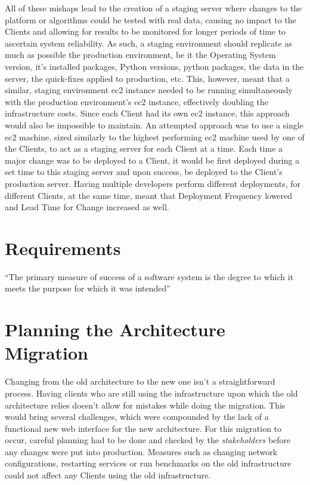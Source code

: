 All of these mishaps lead to the creation of a staging server where changes to the platform or algorithms could be tested with real data, causing no impact to the Clients and allowing for results to be monitored for longer periods of time to ascertain system reliability. As such, a staging environment should replicate as much as possible the production environment, be it the Operating System version, it's installed packages, Python versions, python packages, the data in the server, the quick-fixes applied to production, etc.
This, however, meant that a similar, staging environment \gls{ec2} instance needed to be running simultaneously with the production environment's \gls{ec2} instance, effectively doubling the infrastructure costs. Since each Client had its own \gls{ec2} instance, this approach would also be impossible to maintain. An attempted approach was to use a single \gls{ec2} machine, sized similarly to the highest performing \gls{ec2} machine used by one of the Clients, to act as a staging server for each Client at a time. Each time a major change was to be deployed to a Client, it would be first deployed during a set time to this staging server and upon success, be deployed to the Client's production server. Having multiple developers perform different deployments, for different Clients, at the same time, meant that Deployment Frequency lowered and Lead Time for Change increased as well.




\section{Requirements}\label{methodology:s:requirements}

``The primary measure of success of a software system is the
degree to which it meets the purpose for which it was
intended''


\section{Planning the Architecture Migration}\label{methodology:s:planning-the-architecture-migration}

Changing from the old architecture to the new one isn't a straightforward process. Having clients who are still using the infrastructure upon which the old architecture relies doesn't allow for mistakes while doing the migration. This would bring several challenges, which were compounded by the lack of a functional new web interface for the new architecture. For this migration to occur, careful planning had to be done and checked by the \textit{stakeholders} before any changes were put into production. Measures such as changing network configurations, restarting services or run benchmarks on the old infrastructure could not affect any Clients using the old infrastructure.

